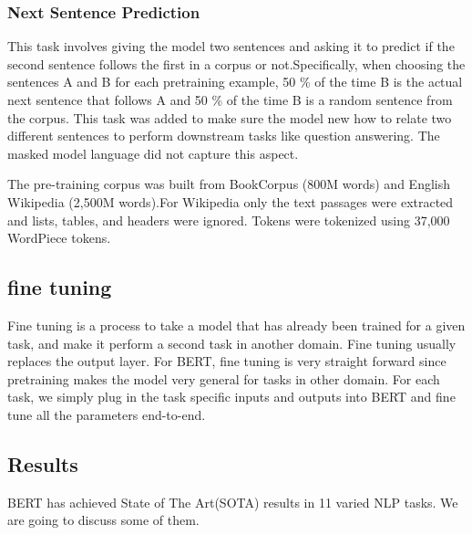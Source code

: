 \documentclass[12pt,a4paper]{article}
\numberwithin{equation}{section}
\begin{document}
\subsubsection{Next Sentence Prediction}
This task involves giving the model two sentences and asking it to predict if the second sentence follows the first in a corpus or not.Specifically, when choosing the sentences A and B for each pretraining example, 50 \% of the time B is the actual
next sentence that follows A and 50 \% of the time B is a random sentence from the corpus. 
This task was added to make sure the model new how to relate two different sentences to perform downstream tasks like question answering. The masked model language did not capture this aspect.

The pre-training corpus was built from BookCorpus (800M words) and English Wikipedia (2,500M words).For Wikipedia  only the text passages were extracted
and  lists, tables, and headers were ignored. Tokens were tokenized using 37,000 WordPiece tokens.

\subsection{fine tuning}
Fine tuning is a process to take a  model that has already been trained for a given task, and make it perform a second task in another domain. Fine tuning usually replaces the output layer. For BERT, fine tuning is very straight forward since pretraining makes the model very general for tasks in other domain. For each task, we simply plug in the task specific inputs and outputs into BERT and fine tune all the parameters end-to-end.

\subsection{Results}
BERT has achieved State of The Art(SOTA) results in 11 varied NLP tasks. We are going to discuss some of them. 
\end{document}
